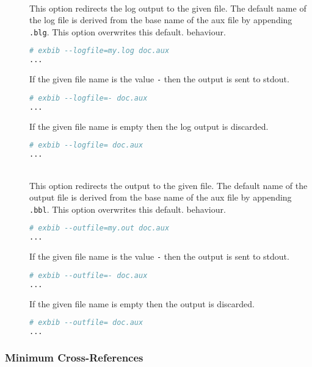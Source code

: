 \begin{description}
\item[ ]
\item[ ]\ \\
  This option redirects the log output to the given file. The default
  name of the log file is derived from the base name of the aux file
  by appending \texttt{.blg}. This option overwrites this default.
  behaviour.
\begin{lstlisting}[language=sh]
# exbib --logfile=my.log doc.aux
...
\end{lstlisting}

  If the given file name is the value \texttt{-} then the output is
  sent to stdout.
\begin{lstlisting}[language=sh]
# exbib --logfile=- doc.aux
...
\end{lstlisting}

  If the given file name is empty then the log output is discarded.
\begin{lstlisting}[language=sh]
# exbib --logfile= doc.aux
...
\end{lstlisting}

\item[ ]
\item[ ]
\item[ ]\ \\
  This option redirects the output to the given file. The default
  name of the output file is derived from the base name of the aux file
  by appending \texttt{.bbl}. This option overwrites this default.
  behaviour.
\begin{lstlisting}[language=sh]
# exbib --outfile=my.out doc.aux
...
\end{lstlisting}

  If the given file name is the value \texttt{-} then the output is
  sent to stdout.
\begin{lstlisting}[language=sh]
# exbib --outfile=- doc.aux
...
\end{lstlisting}

  If the given file name is empty then the output is discarded.
\begin{lstlisting}[language=sh]
# exbib --outfile= doc.aux
...
\end{lstlisting}

\end{description}


\subsubsection{Minimum Cross-References}

